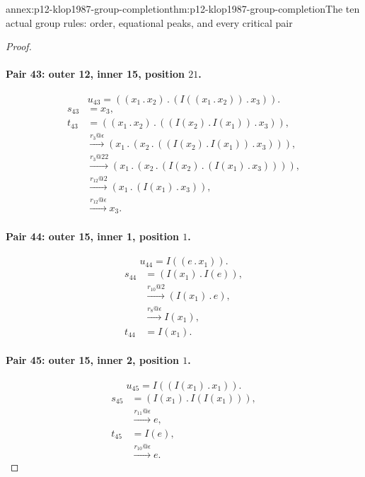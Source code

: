 \begin{annexitem}{annex:p12-klop1987-group-completion}{thm:p12-klop1987-group-completion}{The ten actual group rules: order, equational peaks, and every critical pair}
\begin{proof}
\paragraph{Pair 43: outer 12, inner 15, position \(21\).}
\[
 u_{43}=((x_{1}\mathbin{.}x_{2})\mathbin{.}(I((x_{1}\mathbin{.}x_{2}))\mathbin{.}x_{3})).
\]
\begin{align*}
 s_{43}&=x_{3},\\
 t_{43}&=((x_{1}\mathbin{.}x_{2})\mathbin{.}((I(x_{2})\mathbin{.}I(x_{1}))\mathbin{.}x_{3})),\\
 &\xrightarrow{r_{3}@\epsilon}(x_{1}\mathbin{.}(x_{2}\mathbin{.}((I(x_{2})\mathbin{.}I(x_{1}))\mathbin{.}x_{3}))),\\
 &\xrightarrow{r_{3}@22}(x_{1}\mathbin{.}(x_{2}\mathbin{.}(I(x_{2})\mathbin{.}(I(x_{1})\mathbin{.}x_{3})))),\\
 &\xrightarrow{r_{12}@2}(x_{1}\mathbin{.}(I(x_{1})\mathbin{.}x_{3})),\\
 &\xrightarrow{r_{12}@\epsilon}x_{3}.
\end{align*}

\paragraph{Pair 44: outer 15, inner 1, position \(1\).}
\[
 u_{44}=I((e\mathbin{.}x_{1})).
\]
\begin{align*}
 s_{44}&=(I(x_{1})\mathbin{.}I(e)),\\
 &\xrightarrow{r_{10}@2}(I(x_{1})\mathbin{.}e),\\
 &\xrightarrow{r_{8}@\epsilon}I(x_{1}),\\
 t_{44}&=I(x_{1}).
\end{align*}

\paragraph{Pair 45: outer 15, inner 2, position \(1\).}
\[
 u_{45}=I((I(x_{1})\mathbin{.}x_{1})).
\]
\begin{align*}
 s_{45}&=(I(x_{1})\mathbin{.}I(I(x_{1}))),\\
 &\xrightarrow{r_{11}@\epsilon}e,\\
 t_{45}&=I(e),\\
 &\xrightarrow{r_{10}@\epsilon}e.
\end{align*}


\end{proof}
\end{annexitem}

